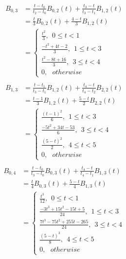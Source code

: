 \documentclass[12pt,a4paper]{article}
\theoremstyle{definition}
\numberwithin{equation}{section}
\numberwithin{figure}{section}
\begin{document}
\begin{align*}
B_{0,3}&= \frac{t-t_0}{t_{2}-t_0}B_{0,2}(t)+\frac{t_{3}-t}{t_{3}-t_{1}}B_{1,2}(t)\\
&=\frac{t}{3}B_{0,2}(t)+\frac{4-t}{3}B_{1,2}(t)\\
&=\left\{
\begin{array}{lr}
\frac{t^2}{3}, ~~0\leq t< 1\\
\frac{-t^2+4t-2}{3}, ~~1\leq t<3\\
\frac{t^2-8t+16}{3}, ~~3\leq t<4\\
0,~~~otherwise
\end{array}
\right.\\
\end{align*}
\begin{align*}
B_{1,3}&= \frac{t-t_1}{t_{3}-t_1}B_{1,2}(t)+\frac{t_{4}-t}{t_{4}-t_{2}}B_{2,2}(t)\\
&=\frac{t-1}{3}B_{1,2}(t)+\frac{5-t}{2}B_{2,2}(t)\\
&=\left\{
\begin{array}{lr}
\frac{(t-1)^2}{6}, ~~1\leq t< 3\\
\frac{-5t^2+34t-53}{6}, ~~3\leq t<4\\
\frac{(5-t)^2}{2}, ~~4\leq t<5\\
0,~~~otherwise
\end{array}
\right.\\
\end{align*}
\begin{align*}
B_{0,4}&= \frac{t-t_0}{t_{3}-t_0}B_{0,3}(t)+\frac{t_{4}-t}{t_{4}-t_{1}}B_{1,3}(t)\\
&=\frac{t}{4}B_{0,3}(t)+\frac{5-t}{4}B_{1,3}(t)\\
&=\left\{
\begin{array}{lr}
\frac{t^3}{12}, ~~0\leq t< 1\\
\frac{-3t^3+15t^2-15t+5}{24}, ~~1\leq t< 3\\
\frac{7t^3-75t^2+255t-265}{24}, ~~3\leq t<4\\
\frac{(5-t)^3}{8}, ~~4\leq t<5\\
0,~~~otherwise
\end{array}
\right.\\
\end{align*}
\end{document}
